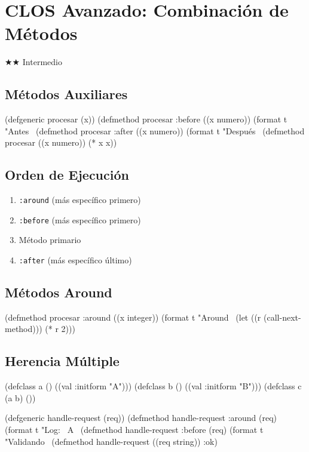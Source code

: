 \chapter{CLOS Avanzado: Combinación de Métodos}
\label{chap:clos-advanced}
{\huge$\bigstar$}{\huge$\bigstar$} Intermedio

\section{Métodos Auxiliares}
\begin{lispcode}
(defgeneric procesar (x))
(defmethod procesar :before ((x numero)) (format t "Antes~%
(defmethod procesar :after ((x numero)) (format t "Después~%
(defmethod procesar ((x numero)) (* x x))
\end{lispcode}

\section{Orden de Ejecución}
\begin{enumerate}
\item \texttt{:around} (más específico primero)
\item \texttt{:before} (más específico primero)
\item Método primario
\item \texttt{:after} (más específico último)
\end{enumerate}

\section{Métodos Around}
\begin{lispcode}
(defmethod procesar :around ((x integer))
  (format t "Around~%
  (let ((r (call-next-method))) (* r 2)))
\end{lispcode}

\section{Herencia Múltiple}
\begin{lispcode}
(defclass a () ((val :initform "A")))
(defclass b () ((val :initform "B")))
(defclass c (a b) ())
\end{lispcode}

\begin{examplebox}[title=Middleware pipeline]
\begin{lispcode}
(defgeneric handle-request (req))
(defmethod handle-request :around (req)
  (format t "Log: ~A~%
(defmethod handle-request :before (req) (format t "Validando~%
(defmethod handle-request ((req string)) :ok)
\end{lispcode}
\end{examplebox}


